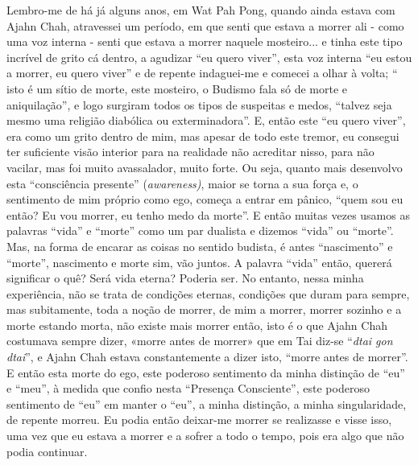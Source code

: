 Lembro-me de há já alguns anos, em Wat Pah Pong, quando ainda estava com
Ajahn Chah, atravessei um período, em que senti que estava a morrer ali
- como uma voz interna - senti que estava a morrer naquele mosteiro... e
tinha este tipo incrível de grito cá dentro, a agudizar ``eu quero
viver'', esta voz interna ``eu estou a morrer, eu quero viver'' e de
repente indaguei-me e comecei a olhar à volta; `` isto é um sítio de
morte, este mosteiro, o Budismo fala só de morte e aniquilação'', e logo
surgiram todos os tipos de suspeitas e medos, ``talvez seja mesmo uma
religião diabólica ou exterminadora''. E, então este ``eu quero viver'',
era como um grito dentro de mim, mas apesar de todo este tremor, eu
consegui ter suficiente visão interior para na realidade não acreditar
nisso, para não vacilar, mas foi muito avassalador, muito forte. Ou
seja, quanto mais desenvolvo esta ``consciência presente''
(\emph{awareness)}, maior se torna a sua força e, o sentimento de mim
próprio como ego, começa a entrar em pânico, ``quem sou eu então? Eu vou
morrer, eu tenho medo da morte''. E então muitas vezes usamos as
palavras ``vida'' e ``morte'' como um par dualista e dizemos ``vida'' ou
``morte''. Mas, na forma de encarar as coisas no sentido budista, é
antes ``nascimento'' e ``morte'', nascimento e morte sim, vão juntos. A
palavra ``vida'' então, quererá significar o quê? Será vida eterna?
Poderia ser. No entanto, nessa minha experiência, não se trata de
condições eternas, condições que duram para sempre, mas subitamente,
toda a noção de morrer, de mim a morrer, morrer sozinho e a morte
estando morta, não existe mais morrer então, isto é o que Ajahn Chah
costumava sempre dizer, «morre antes de morrer» que em Tai diz-se
``\emph{dtai gon dtai}'', e Ajahn Chah estava constantemente a dizer
isto, ``morre antes de morrer''. E então esta morte do ego, este
poderoso sentimento da minha distinção de ``eu'' e ``meu'', à medida que
confio nesta ``Presença Consciente'', este poderoso sentimento de ``eu''
em manter o ``eu'', a minha distinção, a minha singularidade, de repente
morreu. Eu podia então deixar-me morrer se realizasse e visse isso, uma
vez que eu estava a morrer e a sofrer a todo o tempo, pois era algo que
não podia continuar.

